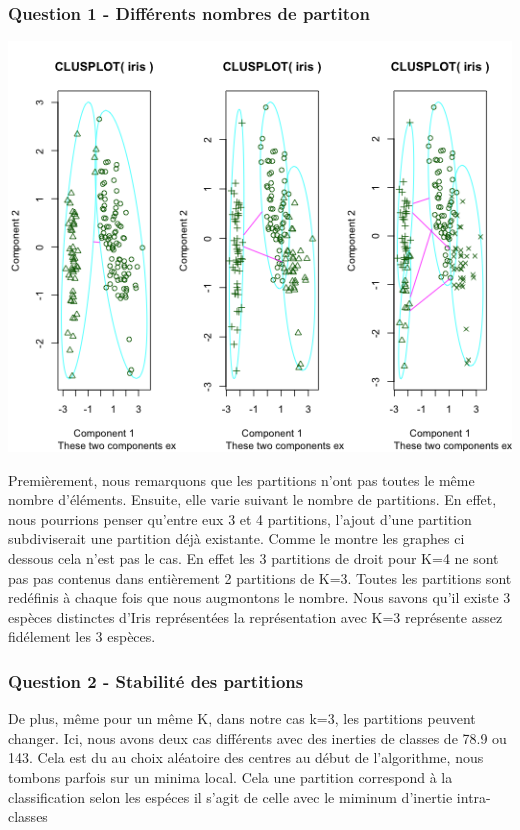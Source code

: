 \documentclass[a4paper,12pt]{report}
\begin{document}
\subsubsection*{Question 1 - Différents nombres de partiton}

\includegraphics[width=\textwidth]{ex2_iris_1.png}


Premièrement, nous remarquons que les partitions n'ont pas toutes le même nombre d'éléments. 
Ensuite, elle varie suivant le nombre de partitions. En effet, nous pourrions penser qu'entre eux 3 et 4 partitions, l'ajout d'une partition subdiviserait une partition déjà existante. Comme le montre les graphes ci dessous cela n'est pas le cas. En effet les 3 partitions de droit pour K=4 ne sont pas pas contenus dans entièrement 2 partitions de K=3. Toutes les partitions sont redéfinis à chaque fois que nous augmontons le nombre. 
Nous savons qu'il existe 3 espèces distinctes d'Iris représentées la représentation avec K=3 représente assez fidélement les 3 espèces. 
\subsubsection*{Question 2 - Stabilité des partitions}

De plus, même pour un même K, dans notre cas k=3, les partitions peuvent changer. Ici, nous avons deux cas différents avec des inerties de classes de 78.9 ou 143. Cela est du au choix aléatoire des centres au début de l'algorithme, nous tombons parfois sur un minima local. Cela une partition correspond à la classification selon les espéces il s'agit de celle avec le miminum d'inertie intra-classes
\end{document}
